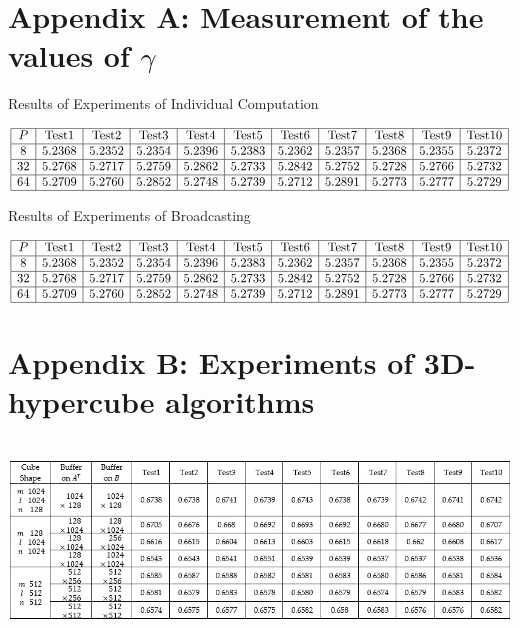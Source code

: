 \documentclass{amsart}
\theoremstyle{definition}
\theoremstyle{remark}
\numberwithin{equation}{section}
\begin{document}
\begin{appendix}
\section*{Appendix A: Measurement of the values of $\gamma$}
\begin{table}[h]
\caption*{Results of Experiments of Individual Computation}
\renewcommand\arraystretch{1.5}
\noindent\[
\begin{array}{|c|c|c|c|c|c|c|c|c|c|c|}
\hline
P&\text{Test1}&\text{Test2}&\text{Test3}&\text{Test4}&\text{Test5}&\text{Test6}&\text{Test7}&\text{Test8}&\text{Test9}&\text{Test10}\\
\hline
8&5.2368&5.2352&5.2354&5.2396&5.2383&5.2362&5.2357&5.2368&5.2355&5.2372\\
\hline
32&5.2768&5.2717&5.2759&5.2862&5.2733&5.2842&5.2752&5.2728&5.2766&5.2732\\
\hline
64&5.2709&5.2760&5.2852&5.2748&5.2739&5.2712&5.2891&5.2773&5.2777&5.2729\\
\hline
\end{array}
\]
\end{table}

\begin{table}[h]
\caption*{Results of Experiments of Broadcasting}
\renewcommand\arraystretch{1.5}
\noindent\[
\begin{array}{|c|c|c|c|c|c|c|c|c|c|c|}
\hline
P&\text{Test1}&\text{Test2}&\text{Test3}&\text{Test4}&\text{Test5}&\text{Test6}&\text{Test7}&\text{Test8}&\text{Test9}&\text{Test10}\\
\hline
8&5.2368&5.2352&5.2354&5.2396&5.2383&5.2362&5.2357&5.2368&5.2355&5.2372\\
\hline
32&5.2768&5.2717&5.2759&5.2862&5.2733&5.2842&5.2752&5.2728&5.2766&5.2732\\
\hline
64&5.2709&5.2760&5.2852&5.2748&5.2739&5.2712&5.2891&5.2773&5.2777&5.2729\\
\hline
\end{array}
\]
\end{table}

\newpage
\section*{Appendix B: Experiments of 3D-hypercube algorithms}
\\
\includegraphics[scale=0.5]{figures/Appendix_Alg1.jpg}\par


\end{appendix}
\end{document}
